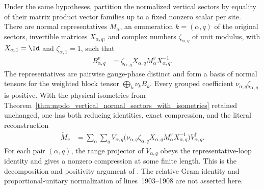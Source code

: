 \begin{theorem}
    \label{thm:mpdo_vertical_bnt_grouping_with_isometries}
    \leanok
    Under the same hypotheses, partition the normalized vertical sectors by
    equality of their matrix product vector families up to a fixed nonzero
    scalar per site. There are normal representatives $M_\alpha$, an enumeration
    $k=(\alpha,q)$ of the original sectors, invertible matrices
    $X_{\alpha,q}$, and complex numbers $\zeta_{\alpha,q}$ of unit modulus,
    with $X_{\alpha,1}=\Id$ and $\zeta_{\alpha,1}=1$, such that
    \begin{align}
        B_{\alpha,q}^v
        &=\zeta_{\alpha,q}X_{\alpha,q}
          M_\alpha^vX_{\alpha,q}^{-1}.
        \label{eq:mpdo_vertical_gauge_phase}
    \end{align}
    The representatives are pairwise gauge-phase distinct and form a basis of
    normal tensors for the weighted block tensor
    $\bigoplus_k\nu_kB_k$. Every grouped coefficient
    $\nu_{\alpha,q}\zeta_{\alpha,q}$ is positive. With the physical isometries
    from Theorem~\ref{thm:mpdo_vertical_normal_sectors_with_isometries}
    retained unchanged, one has both reducing identities, exact compression,
    and the literal reconstruction
    \begin{align}
        \widetilde M_v
        &=\sum_\alpha\sum_q
          V_{\alpha,q}
          \bigl(\nu_{\alpha,q}\zeta_{\alpha,q}
          X_{\alpha,q}M_\alpha^vX_{\alpha,q}^{-1}\bigr)
          V_{\alpha,q}^\dagger.
        \label{eq:mpdo_vertical_grouped_reconstruction}
    \end{align}
    For each pair $(\alpha,q)$, the range projector of $V_{\alpha,q}$ obeys
    the representative-loop identity and gives a nonzero compression at some
    finite length. This is the decomposition and positivity argument of
    \cite[Proposition~4.13, lines 1898--1902]{Cirac2016MPDO_arXiv}. The
    relative Gram identity and proportional-unitary normalization of
    lines~1903--1908 are not asserted here.
\end{theorem}

